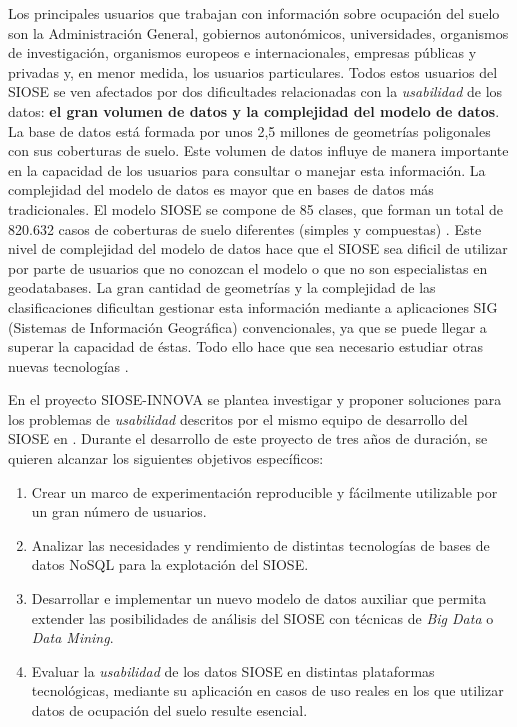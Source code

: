 Los principales usuarios que trabajan con información sobre ocupación del suelo son la Administración General, gobiernos autonómicos, universidades, organismos de investigación, organismos europeos e internacionales, empresas públicas y privadas y, en menor medida, los usuarios particulares. Todos estos usuarios del SIOSE se ven afectados por dos dificultades relacionadas con la \textit{usabilidad} de los datos: \textbf{el gran volumen de datos y la complejidad del modelo de datos}. La base de datos está formada por unos 2,5 millones de geometrías poligonales con sus coberturas de suelo. Este volumen de datos influye de manera importante en la capacidad de los usuarios para consultar o manejar esta información. La complejidad del modelo de datos es mayor que en bases de datos más tradicionales. El modelo SIOSE se compone de 85 clases, que forman un total de 820.632 casos de coberturas de suelo diferentes (simples y compuestas) \citep{FernandezVillarino2012}. Este nivel de complejidad del modelo de datos hace que el SIOSE sea dificil de utilizar por parte de usuarios que no conozcan el modelo o que no son especialistas en geodatabases. La gran cantidad de geometrías y la complejidad de las clasificaciones dificultan gestionar esta información mediante a aplicaciones SIG (Sistemas de Información Geográfica) convencionales, ya que se puede llegar a superar la capacidad de éstas. Todo ello hace que sea necesario estudiar otras nuevas tecnologías \citep{NavarroCarrion2016}.

En el proyecto SIOSE-INNOVA se plantea investigar y proponer soluciones para los problemas de \textit{usabilidad} descritos por el mismo equipo de desarrollo del SIOSE en \citet{FernandezVillarino2012}. Durante el desarrollo de este proyecto de tres años de duración, se quieren alcanzar los siguientes objetivos específicos:
\begin{enumerate}
\item Crear un marco de experimentación reproducible y fácilmente utilizable por un gran número de usuarios.
\item Analizar las necesidades y rendimiento de distintas tecnologías de bases de datos NoSQL para la explotación del SIOSE.
\item Desarrollar e implementar un nuevo modelo de datos auxiliar que permita extender las posibilidades de análisis del SIOSE con técnicas de \textit{Big Data} o \textit{Data Mining}.
\item Evaluar la \textit{usabilidad} de los datos SIOSE en distintas plataformas tecnológicas, mediante su aplicación en casos de uso reales en los que utilizar datos de ocupación del suelo resulte esencial.
\end{enumerate}


